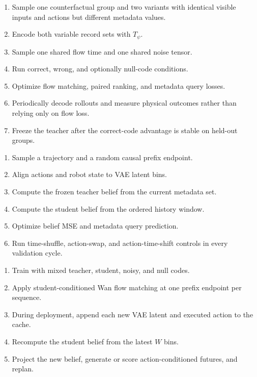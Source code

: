 \documentclass[11pt]{article}
\begin{document}
\begin{plainbox}[title=Phase 1: metadata teacher and oracle Wan conditioning]
\begin{enumerate}
  \item Sample one counterfactual group and two variants with identical visible
  inputs and actions but different metadata values.
  \item Encode both variable record sets with $T_\psi$.
  \item Sample one shared flow time and one shared noise tensor.
  \item Run correct, wrong, and optionally null-code conditions.
  \item Optimize flow matching, paired ranking, and metadata query losses.
  \item Periodically decode rollouts and measure physical outcomes rather than
  relying only on flow loss.
  \item Freeze the teacher after the correct-code advantage is stable on held-out groups.
\end{enumerate}
\end{plainbox}

\begin{plainbox}[title=Phase 2: student distillation]
\begin{enumerate}
  \item Sample a trajectory and a random causal prefix endpoint.
  \item Align actions and robot state to VAE latent bins.
  \item Compute the frozen teacher belief from the current metadata set.
  \item Compute the student belief from the ordered history window.
  \item Optimize belief MSE and metadata query prediction.
  \item Run time-shuffle, action-swap, and action-time-shift controls in every validation cycle.
\end{enumerate}
\end{plainbox}

\begin{plainbox}[title=Phase 3/4: substitution and deployment adaptation]
\begin{enumerate}
  \item Train with mixed teacher, student, noisy, and null codes.
  \item Apply student-conditioned Wan flow matching at one prefix endpoint per sequence.
  \item During deployment, append each new VAE latent and executed action to the cache.
  \item Recompute the student belief from the latest $W$ bins.
  \item Project the new belief, generate or score action-conditioned futures, and replan.
\end{enumerate}
\end{plainbox}
\end{document}
